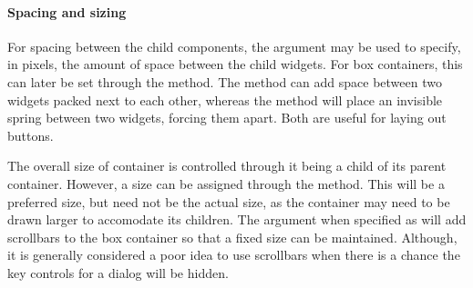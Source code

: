 \paragraph{Spacing and sizing}
For spacing between the child components, the argument
 may be used to specify, in pixels, the
amount of space between the child widgets. For box containers, this can later be set
through the  method. The method
 can add space between two widgets packed
next to each other, whereas the method  will place
an invisible spring between two widgets, forcing them apart.  Both are
useful for laying out buttons.

The overall size of  container is controlled through it
being a child of its parent container. However, a size can be assigned
through the  method. This will be a
preferred size, but need not be the actual size, as the container may
need to be drawn larger to accomodate its children. The argument
 when specified as  will
add scrollbars to the box container so that a fixed size can be
maintained. Although, it is generally considered a poor idea to use
scrollbars when there is a chance the key controls for a dialog will
be hidden.


